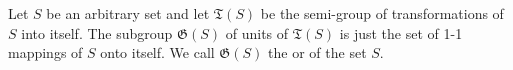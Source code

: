 Let $S$ be an arbitrary set and let $\mathfrak{T}(S)$ be the semi-group of transformations of $S$ into itself. The subgroup $\mathfrak{G}(S)$ of units of $\mathfrak{T}(S)$ is just the set of 1-1 mappings of $S$ onto itself. We call $\mathfrak{G}(S)$ the  or  of the set $S$.
